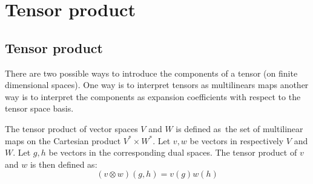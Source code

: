 
\section{Tensor product}
\subsection{Tensor product}

	There are two possible ways to introduce the components of a tensor (on finite dimensional spaces). One way is to interpret tensors as multilinears maps another way is to interpret the components as expansion coefficients with respect to the tensor space basis.
    
	\begin{definition}\label{tensor:tensor_product}
    		The tensor product of vector spaces $V$ and $W$ is defined as\footnotemark\ the set of multilinear maps on the Cartesian product $V^*\times W^*$. Let $v, w$ be vectors in respectively $V$ and $W$. Let $g, h$ be vectors in the corresponding dual spaces. The tensor product of $v$ and $w$ is then defined as:
        	\begin{equation}
        		\boxed{(v\otimes w)(g, h) = v(g)w(h)}
	        \end{equation}
	\end{definition}
	
